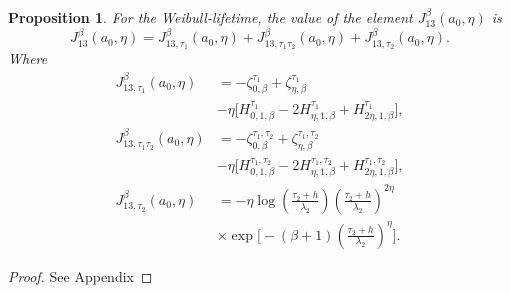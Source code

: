 \documentclass{article}
\newtheorem{proposition}[theorem]{Proposition}
\begin{document}
\begin{proposition}
For the Weibull-lifetime, the value of the element $J_{13}^{\beta}(a_0,\eta)$ is
\begin{equation*}
J_{13}^{\beta}(a_0,\eta)=J_{13,\tau_1}^{\beta}(a_0,\eta)+J_{13,\tau_1\tau_2}^{\beta}(a_0,\eta)+J_{13,\tau_2}^{\beta}(a_0,\eta).
\end{equation*}
Where
\begin{equation}
\begin{aligned}
J_{13,\tau_1}^{\beta}(a_0,\eta)
&=
-\zeta_{0,\beta}^{\tau_1}
+\zeta_{\eta,\beta}^{\tau_1}
\\
&
-\eta
\Big[
H_{0,1,\beta}^{\tau_1}
-2 H_{\eta,1,\beta}^{\tau_1}
+H_{2\eta,1,\beta}^{\tau_1}
\Big],
\\
J_{13,\tau_1\tau_2}^{\beta}(a_0,\eta)
&=
-\zeta_{0,\beta}^{\tau_1,\tau_2}
+\zeta_{\eta,\beta}^{\tau_1,\tau_2}
\\
&
-\eta
\Big[
H_{0,1,\beta}^{\tau_1,\tau_2}
-2 H_{\eta,1,\beta}^{\tau_1,\tau_2}
+H_{2\eta,1,\beta}^{\tau_1,\tau_2}
\Big],
\\
J_{13,\tau_2}^{\beta}(a_0,\eta)
&=
-\eta
\log\!\left(
\frac{\tau_2+h}{\lambda_2}
\right)
\left(
\frac{\tau_2+h}{\lambda_2}
\right)^{2\eta}
\\
&\times
\exp\!\Bigg[
-(\beta+1)
\left(
\frac{\tau_2+h}{\lambda_2}
\right)^{\eta}
\Bigg].
\end{aligned}
\end{equation}

\end{proposition}
\begin{proof}
See Appendix
\end{proof}
\end{document}
